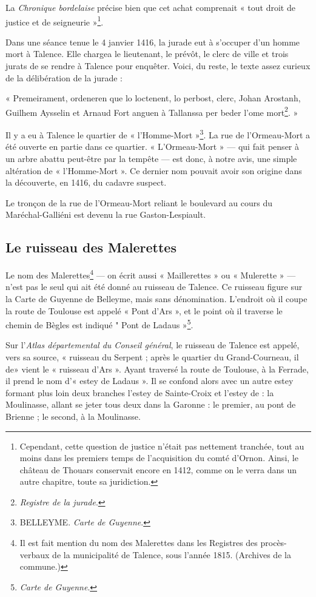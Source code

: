 La \textit{Chronique bordelaise} précise bien que cet achat comprenait « tout droit de justice et de seigneurie »\footnote{Cependant, cette question de justice n'était pas nettement tranchée, tout au moins dans les premiers temps de l'acquisition du comté d'Ornon. Ainsi, le château de Thouars conservait encore en 1412, comme on le verra dans un autre chapitre, toute sa juridiction.}. 

Dans une séance tenue le 4 janvier 1416, la jurade eut à s'occuper d'un homme mort à Talence. Elle chargea le lieutenant, le prévôt, le clerc de ville et trois jurats de se rendre à Talence pour enquêter. Voici, du reste, le texte assez curieux de la délibération de la jurade : 

« Premeirament, ordeneren que lo loctenent, lo perbost, clerc, Johan Arostanh, Guilhem Aysselin et Arnaud Fort anguen à Tallanssa per beder l'ome mort\footnote{\textit{Registre de la jurade}.}. » 

Il y a eu à Talence le quartier de « l'Homme-Mort »\footnote{BELLEYME. \textit{Carte de Guyenne}.}. La rue de l'Ormeau-Mort a été ouverte en partie dans ce quartier. « L'Ormeau-Mort » — qui fait penser à un arbre abattu peut-être par la tempête — est donc, à notre avis, une simple altération de « l'Homme-Mort ». Ce dernier nom pouvait avoir son origine dans la découverte, en 1416, du cadavre suspect.

Le tronçon de la rue de l'Ormeau-Mort reliant le boulevard au cours du Maréchal-Galliéni est devenu la rue Gaston-Lespiault.

\subsection{Le ruisseau des Malerettes} 

Le nom des Malerettes\footnote{Il est fait mention du nom des Malerettes dans les Registres des procès-verbaux de la municipalité de Talence, sous l'année 1815. (Archives de la commune.) } — on écrit aussi « Maillerettes » ou « Mulerette » — n'est pas le seul qui ait été donné au ruisseau de Talence. Ce ruisseau figure sur la Carte de Guyenne de Belleyme, mais sans dénomination. L'endroit  où il coupe la route de Toulouse est appelé « Pont d'Ars », et le point où il traverse le chemin de Bègles est indiqué " Pont de Ladaus »\footnote{\textit{Carte de Guyenne}.}.

Sur l'\textit{Atlas départemental du Conseil général}, le ruisseau de Talence est appelé, vers sa source, « ruisseau du Serpent ; après le quartier du Grand-Courneau, il de» vient le « ruisseau d'Ars ». Ayant traversé la route de Toulouse, à la Ferrade, il prend le nom d'« estey de Ladaus ». Il se confond alors avec un autre estey formant plus loin deux branches l'estey de Sainte-Croix et l'estey de : la Moulinasse, allant se jeter tous deux dans la Garonne : le premier, au pont de Brienne ; le second, à la Moulinasse.

